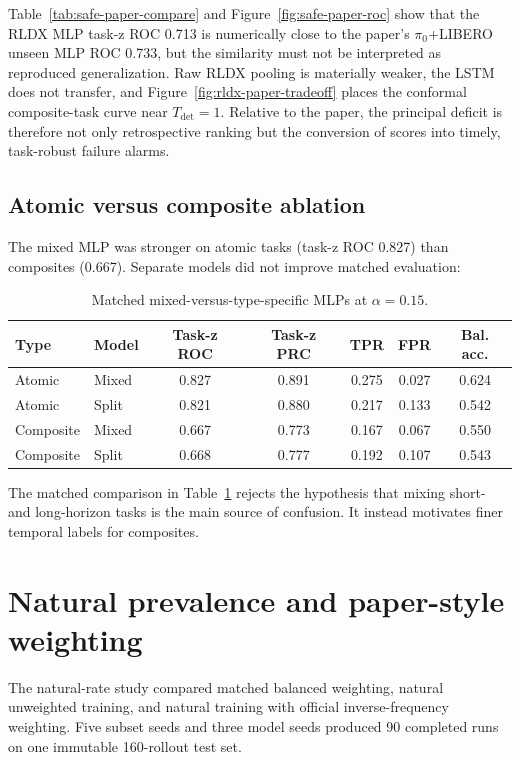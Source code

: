 \documentclass[11pt,a4paper]{article}
\begin{document}
Table~\ref{tab:safe-paper-compare} and Figure~\ref{fig:safe-paper-roc} show
that the RLDX MLP task-z ROC 0.713 is numerically close to the paper's
$\pi_0$+LIBERO unseen MLP ROC 0.733, but the similarity must not be interpreted
as reproduced generalization. Raw RLDX pooling is materially weaker, the LSTM
does not transfer, and Figure~\ref{fig:rldx-paper-tradeoff} places the
conformal composite-task curve near $T_{\mathrm{det}}=1$. Relative to the
paper, the principal deficit is therefore not only retrospective ranking but
the conversion of scores into timely, task-robust failure alarms.

\subsection{Atomic versus composite ablation}
The mixed MLP was stronger on atomic tasks (task-z ROC 0.827) than composites (0.667). Separate models did not improve matched evaluation:

\begin{table}[H]
\centering
\caption{Matched mixed-versus-type-specific MLPs at $\alpha=0.15$.}
\label{tab:rldx-type-ablation}
\begin{tabular}{llccccc}
\toprule
Type & Model & Task-z ROC & Task-z PRC & TPR & FPR & Bal. acc.\\
\midrule
Atomic & Mixed & 0.827 & 0.891 & 0.275 & 0.027 & 0.624\\
Atomic & Split & 0.821 & 0.880 & 0.217 & 0.133 & 0.542\\
Composite & Mixed & 0.667 & 0.773 & 0.167 & 0.067 & 0.550\\
Composite & Split & 0.668 & 0.777 & 0.192 & 0.107 & 0.543\\
\bottomrule
\end{tabular}
\end{table}

The matched comparison in Table~\ref{tab:rldx-type-ablation} rejects the
hypothesis that mixing short- and long-horizon tasks is the main source of
confusion. It instead motivates finer temporal labels for composites.

\section{Natural prevalence and paper-style weighting}

The natural-rate study compared matched balanced weighting, natural unweighted training, and natural training with official inverse-frequency weighting. Five subset seeds and three model seeds produced 90 completed runs on one immutable 160-rollout test set.
\end{document}
